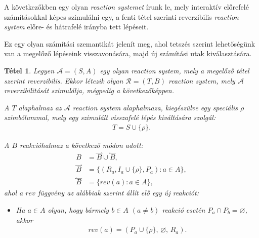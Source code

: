 \documentclass[12pt]{article}
\theoremstyle{definition}
\theoremstyle{remark}
\theoremstyle{plain}
\newtheorem*{theorem*}{Tétel}
\let\emptyset\varnothing
\newcommand{\forwardhat}{\overset{\rightharpoonup}}
\newcommand{\backwardhat}{\overset{\leftharpoonup}}
\newcommand{\reaction}[3]{
    (#1, \, #2, \, #3)
}
\begin{document}
    A következőkben egy olyan \textit{reaction systemet} írunk le, mely interaktív előrefelé számításokkal képes szimulálni egy, a fenti tétel szerinti reverzibilis \textit{reaction system} előre- és hátrafelé irányba tett lépéseit.

    Ez egy olyan számítási szemantikát jelenít meg, ahol tetszés szerint lehetőségünk van a megelőző lépéseink visszavonására, majd új számítási utak kiválasztására.

    \begin{theorem*}
        Legyen $\mathscr{A} = (S, A)$ egy olyan \textit{reaction system}, mely a megelőző tétel szerint reverzibilis. Ekkor létezik olyan $\mathscr{R} = (T, B)$ \textit{reaction system}, mely $\mathscr{A}$ reverzibilitását szimulálja, mégpedig a következőképpen.
        
        A $T$ alaphalmaz az $\mathscr{A}$ \textit{reaction system} alaphalmaza, kiegészülve egy speciális $\rho$ szimbólummal, mely egy szimulált visszafelé lépés kiváltására szolgál:
        \begin{align*}
            T = S \cup \{ \rho \}.
        \end{align*}

        A $B$ reakcióhalmaz a következő módon adott:
        \begin{align*}
            B &= \forwardhat B \cup \backwardhat B, \\
            \forwardhat B &= \{ (R_{a}, I_{a} \cup \{ \rho \}, P_{a}) : a \in A\}, \\
            \backwardhat B &= \{ \textit{rev}(a) : a \in A \},
        \end{align*}
        ahol a $\textit{rev}$ függvény az alábbiak szerint állít elő egy új reakciót:
        \begin{itemize}
            \item
            Ha $a \in A$ olyan, hogy bármely $b \in A$ $(a \neq b)$ reakció esetén $P_{a} \cap P_{b} = \emptyset$, akkor
            \begin{align*}
                \textit{rev}(a) = \reaction{P_{a} \cup \{ \rho \}}{\emptyset}{R_{a}}.
            \end{align*}


\end{itemize}
\end{theorem*}
\end{document}

